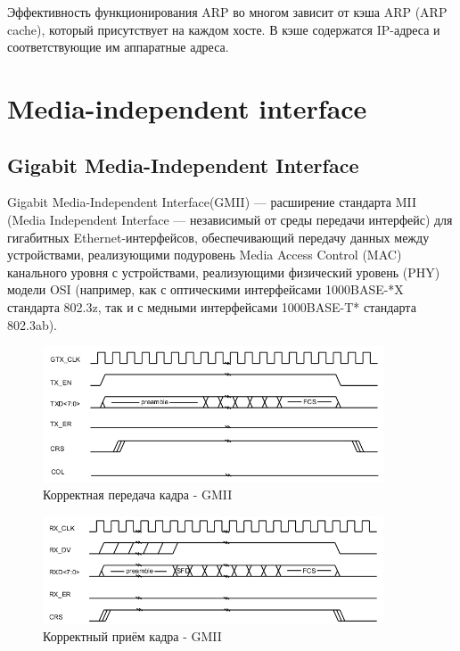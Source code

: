 Эффективность функционирования ARP во многом зависит от кэша ARP (ARP cache), который присутствует на каждом хосте. В кэше содержатся IP-адреса и соответствующие им аппаратные адреса.

\section{Media-independent interface}

\subsection{Gigabit Media-Independent Interface}
Gigabit Media-Independent Interface(GMII) — расширение стандарта MII (Media Independent Interface — независимый от среды передачи интерфейс) для гигабитных Ethernet-интерфейсов, обеспечивающий передачу данных между устройствами, реализующими подуровень Media Access Control (MAC) канального уровня с устройствами, реализующими физический уровень (PHY) модели OSI (например, как с оптическими интерфейсами 1000BASE-*X стандарта 802.3z, так и с медными интерфейсами 1000BASE-T* стандарта 802.3ab).

\begin{figure}[!ht]
	\centering
	\includegraphics[width=0.9\textwidth]{image/GMII_transaction}
	\caption{Корректная передача кадра - GMII}
	\label{GMII_transaction}
\end{figure}

\begin{figure}[!ht]
	\centering
	\includegraphics[width=0.9\textwidth]{image/GMII_RX}
	\caption{Корректный приём кадра - GMII}
	\label{GMII_RX}
\end{figure}

